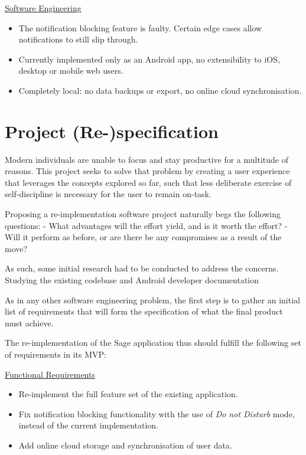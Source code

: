 \underline{Software Engineering}
\begin{itemize}
    \item The notification blocking feature is faulty. Certain edge cases allow notifications to still slip through.
    \item Currently implemented only as an Android app, no extensibility to iOS, desktop or mobile web users.
    \item Completely local: no data backups or export, no online cloud synchronisation.
\end{itemize}


\section{Project (Re-)specification}
Modern individuals are unable to focus and stay productive for a multitude of reasons. This project seeks to solve that problem by creating a user experience that leverages the concepts explored so far, such that less deliberate exercise of self-discipline is necessary for the user to remain on-task.

Proposing a re-implementation software project naturally begs the following questions:
- What advantages will the effort yield, and is it worth the effort?
- Will it perform as before, or are there be any compromises as a result of the move?

As such, some initial research had to be conducted to address the concerns.
Studying the existing codebase and Android developer documentation

As in any other software engineering problem, the first step is to gather an initial list of requirements that will form the specification of what the final product must achieve.

The re-implementation of the Sage application thus should fulfill the following set of requirements in its MVP:

\underline{Functional Requirements}
\begin{itemize}
    \item Re-implement the full feature set of the existing application.
    \item Fix notification blocking functionality with the use of \textit{Do not Disturb} mode, instead of the current implementation.
    \item Add online cloud storage and synchronisation of user data.
\end{itemize}

